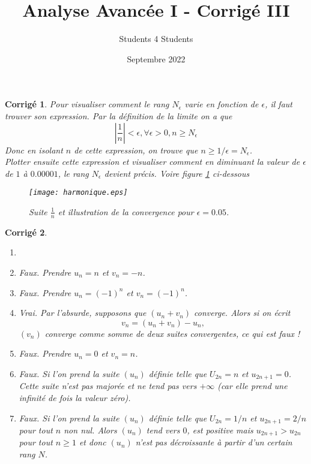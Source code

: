 \documentclass[11pt,french,table]{article}
\title{Analyse Avancée I - Corrigé III}
\author{Students 4 Students}
\date{Septembre 2022}
\theoremstyle{exercice}
\theoremstyle{corrigé}
\newtheorem{corrigé}{Corrigé}
\begin{document}
\maketitle
\begin{corrigé}
Pour visualiser comment le rang $N_\epsilon$ varie en fonction de $\epsilon$, il faut trouver son expression. Par la définition de la limite on a que 
\begin{equation}
    |\frac{1}{n}|<\epsilon, \forall \epsilon>0, n\geq N_\epsilon
\end{equation}
Donc en isolant $n$ de cette expression, on trouve que $n\geq 1/\epsilon=N_\epsilon$. \\
Plotter ensuite cette expression et visualiser comment en diminuant la valeur de $\epsilon$ de $1$ à $0.00001$, le rang $N_\epsilon$ devient précis. Voire figure \ref{fig1} ci-dessous \\
\begin{figure}[h!]
    \centering
    \texttt{[image: harmonique.eps]}
    \caption{Suite $\frac{1}{n}$ et illustration de la convergence pour $\epsilon=0.05$.}
    \label{fig1}
\end{figure}
\end{corrigé}
\vspace{1em}
\begin{corrigé}
\begin{enumerate}
\item[]
    \item Faux. Prendre $u_n=n$ et $v_n=-n$. 
    \item Faux. Prendre $u_n=(-1)^n$ et $v_n=(-1)^n$. 
    \item Vrai. Par l'absurde, supposons que $(u_n+v_n)$ converge. Alors si on écrit 
    \begin{equation*}
        v_n=(u_n+v_n)-u_n,
    \end{equation*}
    $(v_n)$ converge comme somme de deux suites convergentes, ce qui est faux ! 
    \item Faux. Prendre $u_n=0$ et $v_n=n$. 
    \item Faux. Si l'on prend la suite $(u_n)$ définie telle que $U_{2n}=n$ et $u_{2n+1}=0$. Cette suite n'est pas majorée et ne tend pas vers $+\infty$ (car elle prend une infinité de fois la valeur zéro). 
    \item Faux. Si l'on prend la suite $(u_n)$ définie telle que $U_{2n}=1/n$ et $u_{2n+1}=2/n$ pour tout $n$ non nul. Alors $(u_n)$ tend vers $0$, est positive mais $u_{2n+1}>u_{2n}$ pour tout $n\geq 1$ et donc $(u_n)$ n'est pas décroissante à partir d'un certain rang $N$. 
\end{enumerate}
\end{corrigé}
\end{document}
